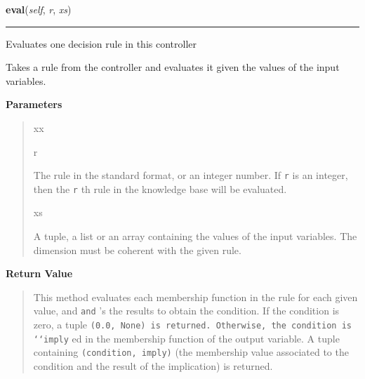     \vspace{0.5ex}

    \begin{boxedminipage}{\textwidth}

    \raggedright \textbf{eval}(\textit{self}, \textit{r}, \textit{xs})

    \vspace{-1.5ex}

    \rule{\textwidth}{0.5\fboxrule}

Evaluates one decision rule in this controller

Takes a rule from the controller and evaluates it given the values of
the input variables.
    \vspace{1ex}

      \textbf{Parameters}
      \begin{quote}
        \begin{Ventry}{xx}

          \item[r]


The rule in the standard format, or an integer number. If \texttt{r} is
an integer, then the \texttt{r} th rule in the knowledge base will be
evaluated.
          \item[xs]


A tuple, a list or an array containing the values of the input
variables. The dimension must be coherent with the given rule.
        \end{Ventry}

      \end{quote}

    \vspace{1ex}

      \textbf{Return Value}
      \begin{quote}

This method evaluates each membership function in the rule for each
given value, and \texttt{and} 's the results to obtain the condition. If
the condition is zero, a tuple \texttt{(0.0, None) is returned. Otherwise,
the condition is `{}`imply} ed in the membership function of the output
variable. A tuple containing \texttt{(condition, imply)} (the membership
value associated to the condition and the result of the implication)
is returned.
      \end{quote}

    \vspace{1ex}

    \end{boxedminipage}

